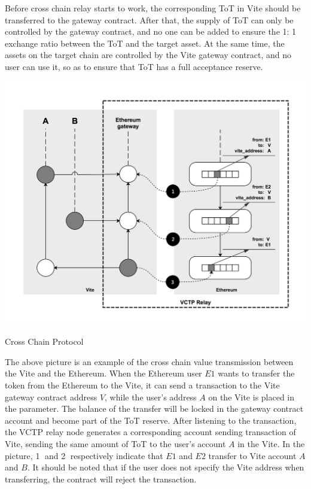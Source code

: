 \documentclass[UTF8,nofonts]{article}
\makeatletter
\newenvironment{figurehere}
 {\def\@captype{figure}}
 {}
\makeatother
\begin{document}
\begin{multicols}{2}
Before cross chain relay starts to work, the corresponding ToT in Vite should be transferred to the gateway contract. After that, the supply of ToT can only be controlled by the gateway contract, and no one can be added to ensure the 1: 1 exchange ratio between the ToT and the target asset. At the same time, the assets on the target chain are controlled by the Vite gateway contract, and no user can use it, so as to ensure that ToT has a full acceptance reserve.

\begin{center}
\begin{figurehere}
\includegraphics[width=\linewidth]{image/crosschain.png}
\caption{Cross Chain Protocol}
\end{figurehere}
\end{center}

The above picture is an example of the cross chain value transmission between the Vite and the Ethereum. When the Ethereum user $E1$ wants to transfer the token from the Ethereum to the Vite, it can send a transaction to the Vite gateway contract address $V$, while the user's address $A$ on the Vite is placed in the parameter. The balance of the transfer will be locked in the gateway contract account and become part of the ToT reserve. After listening to the transaction, the VCTP relay node generates a corresponding account sending transaction of Vite, sending the same amount of ToT to the user's account $A$ in the Vite. In the picture, \textcircled{1} and \textcircled{2} respectively indicate that $E1$ and $E2$ transfer to Vite account $A$ and $B$. It should be noted that if the user does not specify the Vite address when transferring, the contract will reject the transaction.


\end{multicols}
\end{document}
